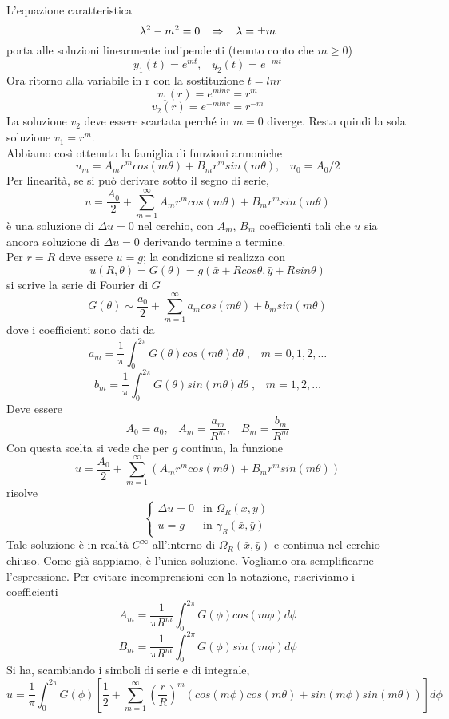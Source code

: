 L'equazione caratteristica
\[
	\lambda^2 - m^2=0 \;\;\; \Rightarrow \;\;\; \lambda= \pm m
\]
porta alle soluzioni linearmente indipendenti (tenuto conto che $m\geq 0$)
\[
	y_1(t)= e^{mt}, \;\;\; y_2(t)= e^{-mt}
\]
Ora ritorno alla variabile in r con la sostituzione $t= ln r$
\[
	v_1(r)= e^{m lnr}= r^m
\]
\[
	v_2(r)= e^{-m lnr}= r^{-m}
\]
La soluzione $v_2$ deve essere scartata perch\'e in $m=0$ diverge.
Resta quindi la sola soluzione $v_1=r^m$.\\
Abbiamo cos\`i ottenuto la famiglia di funzioni armoniche
\[
	u_m= A_m r^m cos(m \theta)+ B_m r^m sin (m \theta), \;\;\; u_0= A_0/2
\]
Per linearit\`a, se si pu\`o derivare sotto il segno di serie,
\[
	u= \frac{A_0}{2} + \sum_{m=1}^{\infty}
	A_m r^m cos(m \theta)+ B_m r^m sin (m \theta)
\]
\`e una soluzione di $\Delta u=0$ nel cerchio, con $A_m$, $B_m$ coefficienti
tali che $u$ sia ancora soluzione di $\Delta u= 0$ derivando termine a
termine.\\
Per $r=R$ deve essere $u=g$; la condizione si realizza con
\[
	u(R, \theta)= G(\theta)= g(\bar{x}+ Rcos \theta, \bar{y} + Rsin\theta)
\]
si scrive la serie di Fourier di $G$
\[
	G(\theta) \sim \frac{a_0}{2}+
	\sum_{m=1}^{\infty} a_m cos (m \theta) + b_m sin (m \theta)
\]
dove i coefficienti sono dati da
\[
	a_m = \frac{1}{\pi}
	\int_{0}^{2 \pi} G(\theta)cos(m \theta) d\theta \; , \;\;\;
m=0,1,2,\ldots
\]
\[
	b_m = \frac{1}{\pi}
	\int_{0}^{2 \pi} G(\theta)sin(m \theta) d\theta \; , \;\;\; m=1,2,\ldots
\]
Deve essere
\[
	A_0=a_0, \;\;\; A_m=\frac{a_m}{R^m}, \;\;\; B_m = \frac{b_m}{R^m}
\]
Con questa scelta si vede che per $g$ continua, la funzione
\[
	u=\frac{A_0}{2}+ \sum_{m=1}^{\infty} \left(
	A_mr^m cos (m \theta)+ B_m r^m sin (m \theta)
	\right)
\]
risolve
\[
	\left\{
	\begin{array}{ll}
		\Delta u=0 	& \text{in } \Omega_R(\bar{x}, \bar{y}) \\
		u=g 		& \text{in } \gamma_R(\bar{x}, \bar{y})
	\end{array}
	\right.
\]
Tale soluzione \`e in realt\`a $C^{\infty}$ all'interno di $\Omega_R (\bar{x},
\bar{y})$
e continua nel cerchio chiuso. Come gi\`a sappiamo, \`e l'unica soluzione.
Vogliamo ora semplificarne l'espressione. Per evitare incomprensioni con la
notazione, riscriviamo i coefficienti
\[
	A_m = \frac{1}{\pi R^m}
	\int_{0}^{2 \pi} G(\phi)cos(m \phi) d\phi
\]
\[
	B_m = \frac{1}{\pi R^m}
	\int_{0}^{2 \pi} G(\phi)sin(m \phi) d\phi
\]
Si ha, scambiando i simboli di serie e di integrale,
\[
	u= \frac{1}{\pi} \int_{0}^{2\pi} G(\phi)
	\left[
	\frac{1}{2}+ \sum_{m=1}^{\infty} \left( \frac{r}{R} \right)^m
	\left(
	cos(m \phi)cos(m \theta) + sin(m\phi)sin(m \theta)
	\right)
	\right] d\phi
\]
